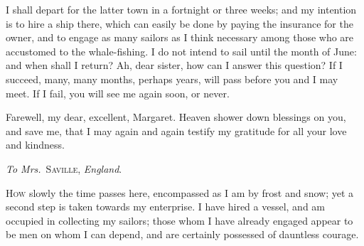I shall depart for the latter town in
a fortnight or three weeks; and my intention
is to hire a ship there, which
can easily be done by paying the insurance
for the owner, and to engage as
many sailors as I think necessary among
those who are accustomed to the whale-fishing.
I do not intend to sail until
the month of June: and when shall I
return? Ah, dear sister, how can I
answer this question? If I succeed,
many, many months, perhaps years,
will pass before you and I may meet.
If I fail, you will see me again soon, or
never.

Farewell, my dear, excellent, Margaret.
Heaven shower down blessings
on you, and save me, that I may again
and again testify my gratitude for all
your love and kindness.




\emph{To Mrs.}~\textsc{Saville}, \emph{England}.


\noindent\textsc{How} slowly the time passes here, encompassed
as I am by frost and snow;
yet a second step is taken towards my
enterprise. I have hired a vessel, and
am occupied in collecting my sailors;
those whom I have already engaged appear
to be men on whom I can depend,
and are certainly possessed of dauntless
courage.

